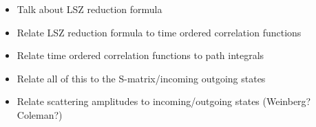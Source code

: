 \documentclass[main.tex]{subfiles}
\begin{document}
\begin{itemize}
\item Talk about LSZ reduction formula
\item Relate LSZ reduction formula to time ordered correlation functions
\item Relate time ordered correlation functions to path integrals
\item Relate all of this to the S-matrix/incoming outgoing states
\item Relate scattering amplitudes to incoming/outgoing states (Weinberg? Coleman?)
\end{itemize}
\end{document}
